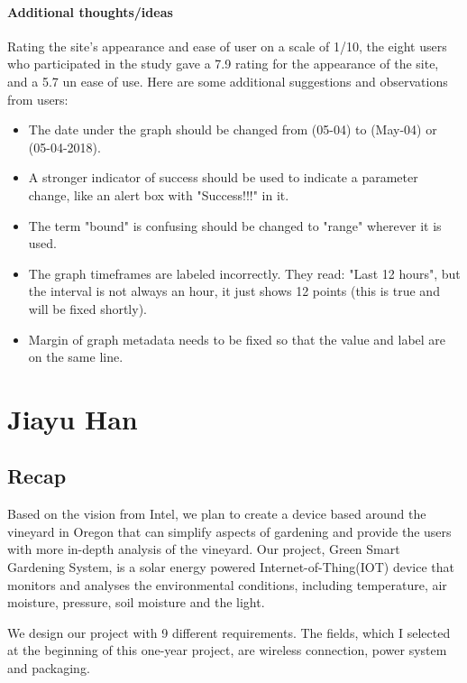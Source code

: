 \documentclass[IEEEtran,letterpaper,10pt,titlepage,fleqn,draftclsnofoot,onecolumn]{article}
\begin{document}
\paragraph{Additional thoughts/ideas}

Rating the site's appearance and ease of user on a scale of 1/10, the eight users who participated in the study gave a 7.9 rating for the appearance of the site, and a 5.7 un ease of use. Here are some additional suggestions and observations from users: 

\begin{itemize}  
\item The date under the graph should be changed from (05-04) to (May-04) or (05-04-2018).
\item A stronger indicator of success should be used to indicate a parameter change, like an alert box with "Success!!!" in it. 
\item The term "bound" is confusing should be changed to "range" wherever it is used.
\item The graph timeframes are labeled incorrectly. They read: "Last 12 hours", but the interval is not always an hour, it just shows 12 points (this is true and will be fixed shortly).
\item Margin of graph metadata needs to be fixed so that the value and label are on the same line.
\end{itemize}


\section{Jiayu Han}

\subsection{Recap}

Based on the vision from Intel, we plan to create a device based around the vineyard in Oregon that can simplify aspects of gardening and provide the users with more in-depth analysis of the vineyard. Our project, Green Smart Gardening System, is a solar energy powered Internet-of-Thing(IOT) device that monitors and analyses the environmental conditions, including temperature, air moisture, pressure, soil moisture and the light.

We design our project with 9 different requirements. The fields, which I selected at the beginning of this one-year project, are wireless connection, power system and packaging.
\end{document}
